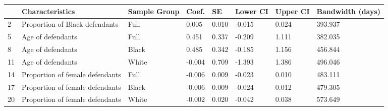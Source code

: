 \begin{tabular}{llllllll}
\toprule
{} &                  Characteristics & Sample Group &   Coef. &     SE & Lower CI & Upper CI & Bandwidth (days) \\
\midrule
2  &   Proportion of Black defendants &         Full &   0.005 &  0.010 &   -0.015 &    0.024 &          393.937 \\
5  &                Age of defendants &         Full &   0.451 &  0.337 &   -0.209 &    1.111 &          382.035 \\
8  &                Age of defendants &        Black &   0.485 &  0.342 &   -0.185 &    1.156 &          456.844 \\
11 &                Age of defendants &        White &  -0.004 &  0.709 &   -1.393 &    1.386 &          496.046 \\
14 &  Proportion of female defendants &         Full &  -0.006 &  0.009 &   -0.023 &    0.010 &          483.111 \\
17 &  Proportion of female defendants &        Black &  -0.006 &  0.009 &   -0.024 &    0.012 &          479.305 \\
20 &  Proportion of female defendants &        White &  -0.002 &  0.020 &   -0.042 &    0.038 &          573.649 \\
\bottomrule
\end{tabular}
